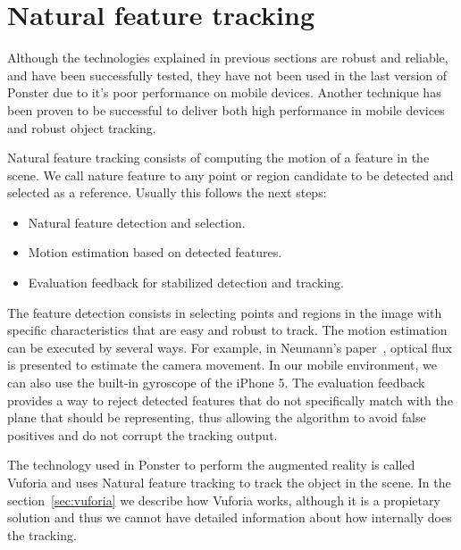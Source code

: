 \section{Natural feature tracking}
\label{sec:naturalfeature}
Although the technologies explained in previous sections are robust and reliable,
and have been successfully tested, they have not been used in the last version of
Ponster due to it's poor performance on mobile devices. Another technique has been proven
to be successful to deliver both high performance in mobile devices and robust
object tracking.

Natural feature tracking consists of computing the motion of a feature in the
scene\cite{neumann}. We call nature feature to any point or
region candidate to be detected and selected as a reference. Usually this
follows the next steps: 
\begin{itemize}
\item Natural feature detection and selection.
\item Motion estimation based on detected features.
\item Evaluation feedback for stabilized detection and tracking.
\end{itemize}
The feature detection consists in selecting points and regions in the image
with specific characteristics that are easy and robust to track. The motion
estimation can be executed by several ways. For example, in Neumann's
paper~\cite{neumann}, optical  
flux is presented to estimate the camera movement. In our mobile environment,
we can also use the built-in gyroscope of the iPhone 5. The evaluation feedback provides a way to reject
detected features that do not specifically match with the plane that should be
representing, thus allowing the algorithm to avoid false positives and do not
corrupt the tracking output.

The technology used in Ponster to perform the augmented reality is called
Vuforia and uses Natural feature tracking to track the object in the scene. In
the section~\ref{sec:vuforia} we describe how Vuforia works, although it is a
propietary solution and thus we cannot have detailed information about how
internally does the tracking. 
